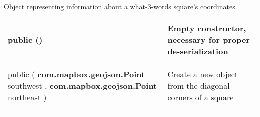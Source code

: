  {\scriptsize Object representing information about a what{-}3{-}words square's coordinates.
 
\vspace*{-5pt} 
\begin{tabularx}{\linewidth}{X|m{}}
\label{tab:W3WSquareData}
\begin{raggedleft}public  \textbf{\hyperref[tab:W3WSquareData]{\color{blue}{W3WSquareData}}}()
\end{raggedleft} &
 Empty constructor, necessary for proper de{-}serialization\\ \hline 
\begin{raggedleft}public  \textbf{\hyperref[tab:W3WSquareData]{\color{blue}{W3WSquareData}} }(\newline \hfill 
\hspace*{ 5pt} \textbf{com.mapbox.geojson.Point} southwest , \newline
 \hspace*{ 5pt} \textbf{com.mapbox.geojson.Point} northeast  )
\end{raggedleft} &
 Create a new \hyperref[tab:W3WSquareData]{\color{blue}{W3WSquareData}} object from the diagonal corners of a square\\\end{tabularx}
}
